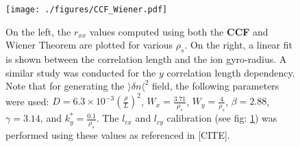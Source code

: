 \documentclass[11pt,a4paper,openany]{report}
\begin{document}
\begin{figure}[H]
    \centering
    \hspace*{-0cm}\texttt{[image: ./figures/CCF\_Wiener.pdf]}
    \caption{On the left, the $r_{xx}$ values computed using both the \textbf{CCF} and Wiener Theorem are plotted for various $\rho_s$. On the right, a linear fit is shown between the correlation length and the ion gyro-radius. A similar study was conducted for the $y$ correlation length dependency. Note that for generating the $\rangle \delta n \langle^2$ field, the following parameters were used: $D = 6.3 \times 10^{-3} (\frac{\rho}{L})^2$, $W_x = \frac{3.71}{\rho_s}$, $W_y = \frac{4}{\rho_s}$, $\beta = 2.88$, $\gamma = 3.14$, and $k_y^* = \frac{0.1}{\rho_s}$. The $l_{cx}$ and $l_{cy}$ calibration (see fig: \ref{Wiener}) was performed using these values as referenced in [CITE].}
    \label{Wiener}
\end{figure}
\end{document}
